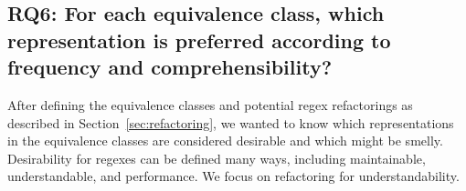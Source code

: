 \subsection{RQ6: For each equivalence class, which representation is preferred according to frequency and comprehensibility?}

After defining the equivalence classes and potential  regex refactorings as described in Section~\ref{sec:refactoring}, we wanted to know which representations in the equivalence classes  are considered desirable and which might be smelly. Desirability for regexes can be defined many ways, including maintainable,  understandable, and performance.
We focus on refactoring for understandability.

